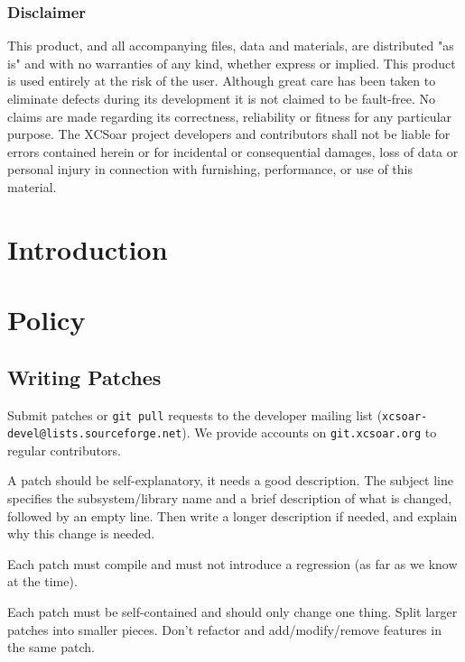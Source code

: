 \documentclass[a4paper,12pt]{refrep}
\begin{document}
\subsection*{Disclaimer}

This product, and all accompanying files, data and materials, are
distributed "as is" and with no warranties of any kind, whether
express or implied.  This product is used entirely at the risk of the
user.  Although great care has been taken to eliminate defects during
its development it is not claimed to be fault-free. No claims are made
regarding its correctness, reliability or fitness for any particular
purpose.  The XCSoar project developers and contributors shall not be
liable for errors contained herein or for incidental or consequential
damages, loss of data or personal injury in connection with
furnishing, performance, or use of this material.


\chapter{Introduction}\label{cha:introduction}



\chapter{Policy}\label{cha:policy}

\section{Writing Patches}

Submit patches or \texttt{git pull} requests to the developer mailing
list (\texttt{xcsoar-devel@lists.sourceforge.net}).  We provide
accounts on \texttt{git.xcsoar.org} to regular contributors.

A patch should be self-explanatory, it needs a good description.  The
subject line specifies the subsystem/library name and a brief
description of what is changed, followed by an empty line.  Then write
a longer description if needed, and explain why this change is needed.

Each patch must compile and must not introduce a regression (as far as
we know at the time).

Each patch must be self-contained and should only change one thing.
Split larger patches into smaller pieces.  Don't refactor and
add/modify/remove features in the same patch.
\end{document}
